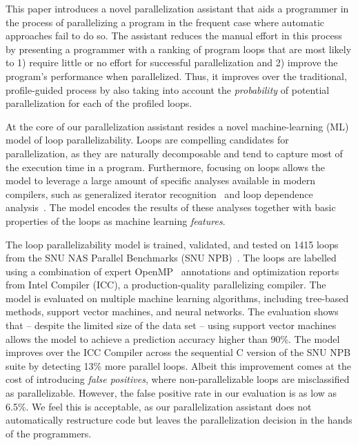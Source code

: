 
This paper introduces a novel parallelization assistant that aids a programmer in the process of parallelizing a program in the frequent case where automatic approaches fail to do so.
%
The assistant reduces the manual effort in this process by presenting a
programmer with a ranking of program loops that are most likely to 1) require little or no effort for successful parallelization and 2) improve the program's performance when parallelized.
%
Thus, it improves over the traditional, profile-guided process by also taking into account the \emph{probability} of potential parallelization for each of the profiled loops.


At the core of our parallelization assistant resides a novel machine-learning (ML) model of loop parallelizability.
%
Loops are compelling candidates for parallelization, as they are naturally
decomposable and tend to capture most of the execution time in a program.
%
Furthermore, focusing on loops allows the model to leverage a large amount of
specific analyses available in modern compilers, such as generalized iterator
recognition~\cite{Manilov:2018:GPI:3178372.3179511} and loop dependence analysis~\cite{Jensen:2017:ILD:3132652.3095754}.
%
The model encodes the results of these analyses together with basic properties of the loops as machine learning \textit{features}.

The loop parallelizability model is trained, validated, and tested on 1415 loops
from the SNU NAS Parallel Benchmarks (SNU
NPB)~\cite{Seo:2011:PCN:2357490.2358063}.
%
The loops are labelled using a combination of expert OpenMP~\cite{Dagum:1998:OIA:615255.615542}
annotations and optimization reports from Intel \cpp{} Compiler (ICC), a
production-quality parallelizing compiler.
%
The model is evaluated on multiple machine learning algorithms, including tree-based methods, support vector machines, and neural networks.
%
The evaluation shows that -- despite the limited size of the data set -- using
support vector machines allows the model to achieve a prediction accuracy higher than 90\%.
%
%
The model improves over the ICC Compiler across the sequential C version of the SNU NPB suite by detecting 13\% more parallel loops. Albeit this improvement comes at the cost of introducing \textit{false positives}, where non-parallelizable loops are misclassified as parallelizable. However, the false positive rate in our evaluation is as low as 6.5\%. We feel this is acceptable, as our parallelization assistant does not automatically restructure code but leaves the parallelization decision in the hands of the programmers.

